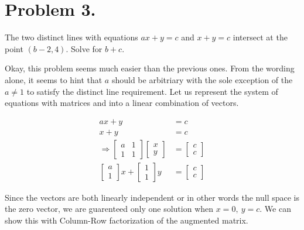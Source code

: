 \section{Problem 3.}
The two distinct lines with equations $ax + y = c$ and $x + y = c$
intersect at the point $(b - 2, 4)$.  Solve for $b + c$.

\begin{solution}
    Okay, this problem seems much easier than the previous ones. From the wording alone, it seems
    to hint that $a$ should be arbitriary with the sole exception of the $a \neq 1$ to satisfy the 
    distinct line requirement. Let us represent the system of equations with matrices and into a linear
    combination of vectors.

    \begin{align*}
        ax + y &= c \\
        x + y &= c \\
 \Longrightarrow
        \begin{bmatrix}
            a & 1 \\
            1 & 1 
        \end{bmatrix}
        \begin{bmatrix}
            x \\
            y
        \end{bmatrix}
        &=
        \begin{bmatrix}
            c \\
            c
        \end{bmatrix} \\
        \begin{bmatrix}
            a \\
            1
        \end{bmatrix} x
        + 
        \begin{bmatrix}
            1 \\
            1
        \end{bmatrix} y
        &= \begin{bmatrix}
            c \\
            c
        \end{bmatrix}
    \end{align*}

    Since the vectors are both linearly independent or in other
    words the null space is the zero vector, we are guarenteed only
    one solution when $x = 0, \ y = c$. We can show this with Column-Row factorization of the augmented matrix.


\end{solution}
